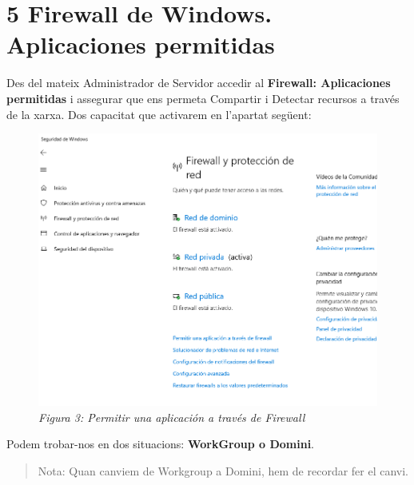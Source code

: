 \documentclass[
  a4paper,
]{article}
\begin{document}
\section{5 Firewall de Windows. Aplicaciones
permitidas}\label{firewall-de-windows.-aplicaciones-permitidas}

Des del mateix Administrador de Servidor accedir al \textbf{Firewall:
Aplicaciones permitidas} i assegurar que ens permeta Compartir i
Detectar recursos a través de la xarxa. Dos capacitat que activarem en
l'apartat següent:

\begin{figure}
\centering
\includegraphics{png/PermitirUnaAplicacionATravesdeFirewall.png}
\caption{\emph{Figura 3: Permitir una aplicación a través de Firewall}}
\end{figure}

Podem trobar-nos en dos situacions: \textbf{WorkGroup o Domini}.

\begin{quote}
Nota: Quan canviem de Workgroup a Domini, hem de recordar fer el canvi.
\end{quote}
\end{document}

